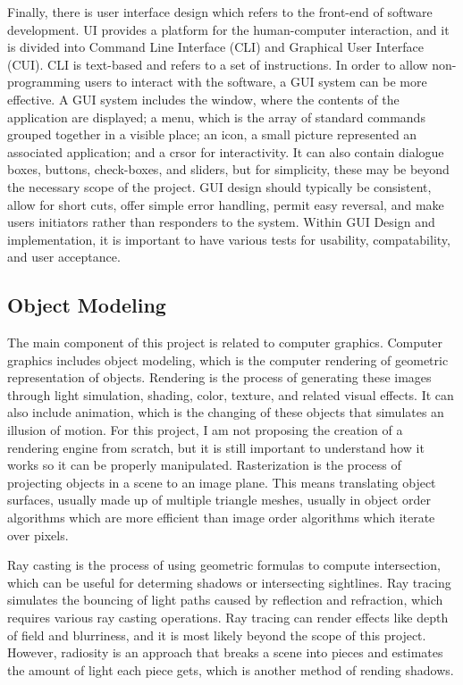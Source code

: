 \documentclass[10pt,twocolumn]{article}
\begin{document}
Finally, there is user interface design which refers to the front-end of software development. UI provides a platform for the human-computer interaction, and it is divided into Command Line Interface (CLI) and Graphical User Interface (CUI). CLI is text-based and refers to a set of instructions. In order to allow non-programming users to interact with the software, a GUI system can be more effective. A GUI system includes the window, where the contents of the application are displayed; a menu, which is the array of standard commands grouped together in a visible place; an icon, a small picture represented an associated application; and a crsor for interactivity. It can also contain dialogue boxes, buttons, check-boxes, and sliders, but for simplicity, these may be beyond the necessary scope of the project. GUI design should typically be consistent, allow for short cuts, offer simple error handling, permit easy reversal, and make users initiators rather than responders to the system. Within GUI Design and implementation, it is important to have various tests for usability, compatability, and user acceptance. 

\subsection{Object Modeling}
The main component of this project is related to computer graphics. Computer graphics includes object modeling, which is the computer rendering of geometric representation of objects. Rendering is the process of generating these images through light simulation, shading, color, texture, and related visual effects. It can also include animation, which is the changing of these objects that simulates an illusion of motion. For this project, I am not proposing the creation of a rendering engine from scratch, but it is still important to understand how it works so it can be properly manipulated. Rasterization is the process of projecting objects in a scene to an image plane. This means translating object surfaces, usually made up of multiple triangle meshes, usually in object order algorithms which are more efficient than image order algorithms which iterate over pixels.

Ray casting is the process of using geometric formulas to compute intersection, which can be useful for determing shadows or intersecting sightlines. Ray tracing simulates the bouncing of light paths caused by reflection and refraction, which requires various ray casting operations. Ray tracing can render effects like depth of field and blurriness, and it is most likely beyond the scope of this project. However, radiosity is an approach that breaks a scene into pieces and estimates the amount of light each piece gets, which is another method of rending shadows. 
\end{document}
